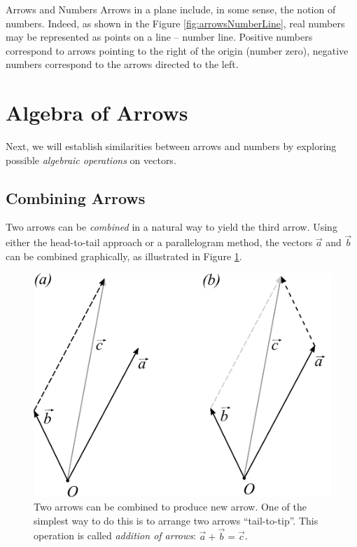 \begin{mybio}{Arrows and Numbers}
Arrows in a plane include, in some sense, the notion of
numbers. Indeed, as shown in the Figure \ref{fig:arrowsNumberLine},
real numbers may be represented as points on a line -- number
line. Positive numbers correspond to arrows pointing to the right of
the origin (number zero), negative numbers correspond to the arrows
directed to the left.
\end{mybio}


\section{Algebra of Arrows}
Next, we will establish similarities between arrows and numbers by
exploring possible \emph{algebraic operations} on vectors.


\subsection{Combining Arrows}

Two arrows can be \emph{combined} in a natural
way to yield the third arrow.
Using either the head-to-tail approach or a parallelogram method,
the vectors \textbf{$\vec{a}$} and $\vec{b}$ can be combined
graphically, as illustrated in Figure \ref{fig:arrowsAddition}.

\begin{figure}[htbp]
  \centering
  \includegraphics[scale=1.0]{arrowsAddition}
  \caption{Two arrows can be combined to produce new
    arrow. One of the simplest way to do this is to arrange two arrows
  ``tail-to-tip''. This operation is called \emph{addition of arrows}:
  $\vec{a}+\vec{b}=\vec{c}$.}
  \label{fig:arrowsAddition}
\end{figure}


